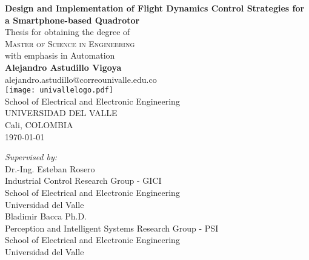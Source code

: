 \begin{titlepage}
\begin{center}
 {\LARGE\bfseries Design and Implementation of Flight Dynamics Control Strategies for a Smartphone-based Quadrotor\\}
 \vspace{2.5cm}
{Thesis for obtaining the degree of} \\[2cm]
\textsc{\Large{{Master of Science in Engineering}}} \\[5pt]
{\large  with emphasis in Automation} \\[2pt]
 \vfill
 \vspace{0.5cm}
 \vspace{1.5cm}
 {\Large\bfseries Alejandro Astudillo Vigoya}\\[5pt]
 alejandro.astudillo@correounivalle.edu.co\\[14pt]
 \vspace{1.5cm}
\texttt{[image: univallelogo.pdf]}\\[5pt]
{School of Electrical and Electronic Engineering}\\[5pt]
{UNIVERSIDAD DEL VALLE}\\[5pt]
{Cali, COLOMBIA}\\
 \vfill
 \vspace{0.3cm}
{\today} %
\end{center}
\end{titlepage}
\begin{titlepage}
\begin{minipage}{.95\linewidth}
\setcounter{page}{2} 
\begin{flushleft}    
 \vspace{10.0cm}
 \textit{Supervised by:}\\
 \vspace{2.5cm}
	Dr.-Ing. Esteban Rosero\\ 
	Industrial Control Research Group - GICI\\
	School of Electrical and Electronic Engineering\\
	Universidad del Valle\\
 \vspace{2.5cm}	
	Bladimir Bacca Ph.D.\\
	Perception and Intelligent Systems Research Group - PSI\\
	School of Electrical and Electronic Engineering\\
	Universidad del Valle\\
\end{flushleft} 
\end{minipage}
\hfill
\end{titlepage}
